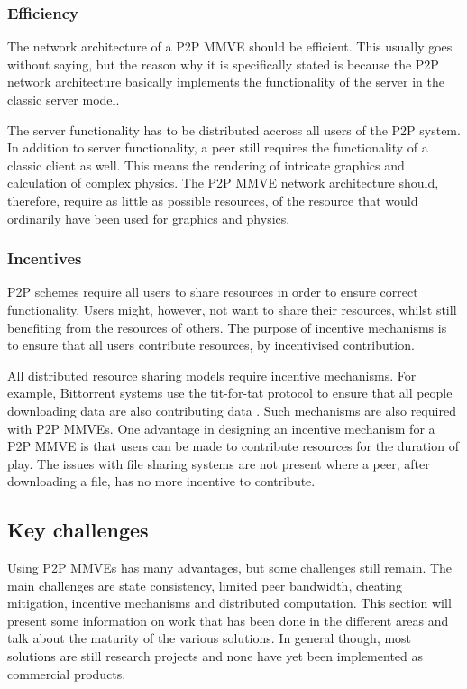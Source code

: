 \subsubsection{Efficiency}

The network architecture of a P2P MMVE should be efficient. This usually goes without saying, but the reason why it is specifically stated is because the P2P network architecture basically implements the functionality of the server in the classic server model.

The server functionality has to be distributed accross all users of the P2P system. In addition to server functionality, a peer still requires the functionality of a classic client as well. This means the rendering of intricate graphics and calculation of complex physics. The P2P MMVE network architecture should, therefore, require as little as possible resources, of the resource that would ordinarily have been used for graphics and physics.

\subsubsection{Incentives}

P2P schemes require all users to share resources in order to ensure correct functionality. Users might, however, not want to share their resources, whilst still benefiting from the resources of others. The purpose of incentive mechanisms is to ensure that all users contribute resources, by incentivised contribution.

All distributed resource sharing models require incentive mechanisms. For example, Bittorrent systems use the tit-for-tat protocol to ensure that all people downloading data are also contributing data \cite{tit_for_tat}. Such mechanisms are also required with P2P MMVEs. One advantage in designing an incentive mechanism for a P2P MMVE is that users can be made to contribute resources for the duration of play. The issues with file sharing systems are not present where a peer, after downloading a file, has no more incentive to contribute.

\subsection{Key challenges}
\label{key_challenges}

Using P2P MMVEs has many advantages, but some challenges still remain. The main challenges are state consistency, limited peer bandwidth, cheating mitigation, incentive mechanisms and distributed computation. This section will present some information on work that has been done in the different areas and talk about the maturity of the various solutions. In general though, most solutions are still research projects and none have yet been implemented as commercial products.

